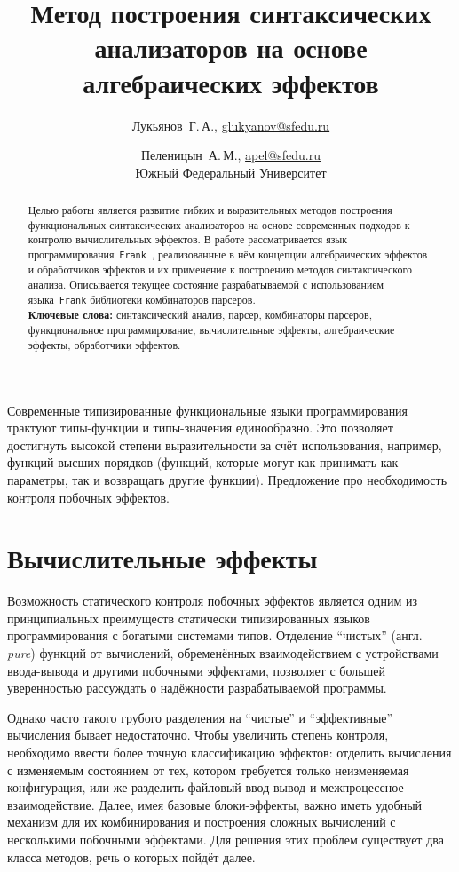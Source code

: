 \documentclass [a4paper] {article}
\title %
  {Метод построения синтаксических анализаторов 
   на основе алгебраических эффектов}
\author %
{%
  Лукьянов~Г.\,А., \url {glukyanov@sfedu.ru} \and %
  Пеленицын~А.\,М., \url {apel@sfedu.ru} \\
  Южный Федеральный Университет
}%
\date {}    %
\begin{document}

\maketitle

\begin {abstract}
  Целью работы является развитие гибких и выразительных методов построения
  функциональных синтаксических анализаторов на основе современных подходов
  к контролю вычислительных эффектов. В работе рассматривается язык 
  программирования~\texttt{Frank}~\cite{Frank}, реализованные в нём концепции
  алгебраических эффектов и обработчиков эффектов и их применение к построению
  методов синтаксического анализа. Описывается текущее состояние
  разрабатываемой с использованием языка~\texttt{Frank} библиотеки комбинаторов
  парсеров.
  \\ \textbf {Ключевые слова:} синтаксический анализ, парсер,
  комбинаторы парсеров, функциональное программирование, вычислительные эффекты,
  алгебраические эффекты, обработчики эффектов. 
\end {abstract}


Современные типизированные функциональные языки программирования трактуют
типы-функции и типы-значения единообразно. Это позволяет достигнуть высокой
степени выразительности за счёт использования, например, функций высших
порядков (функций, которые могут как принимать как параметры, так и
возвращать другие функции). Предложение про необходимость контроля побочных
эффектов.

\section{Вычислительные эффекты}

Возможность статического контроля побочных эффектов является одним из
принципиальных преимуществ статически типизированных языков
программирования с богатыми системами типов. Отделение ``чистых''
(англ. \emph{pure}) функций от вычислений, обременённых
взаимодействием с устройствами ввода-вывода и другими побочными
эффектами, позволяет с большей уверенностью рассуждать о надёжности
разрабатываемой программы. 

Однако часто такого грубого разделения на ``чистые'' и ``эффективные''
вычисления бывает недостаточно. Чтобы увеличить степень контроля, необходимо
ввести более точную классификацию эффектов: отделить вычисления с изменяемым
состоянием от тех, котором требуется только неизменяемая конфигурация, или же
разделить файловый ввод-вывод и межпроцессное взаимодействие. Далее, имея
базовые блоки-эффекты, важно иметь удобный механизм для их комбинирования и
построения сложных вычислений с несколькими побочными эффектами. Для решения
этих проблем существует два класса методов, речь о которых пойдёт далее.
\end{document}
